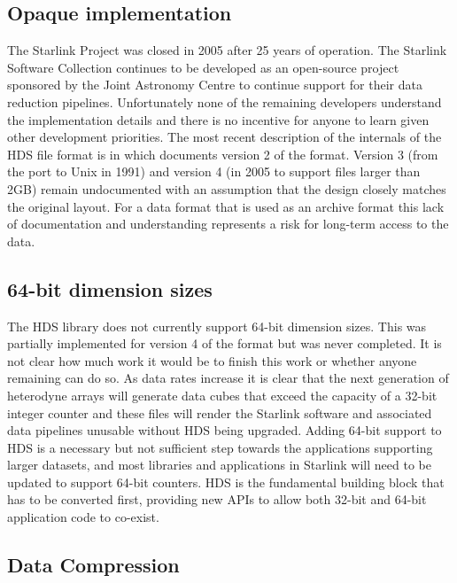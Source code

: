 \documentclass[final,authoryear,5p,times,twocolumn]{elsarticle}
\begin{document}
\subsection{Opaque implementation}

The Starlink Project was closed in 2005 after 25 years of
operation. The Starlink Software Collection continues to be developed
as an open-source project sponsored by the Joint Astronomy Centre to
continue support for their data reduction pipelines. Unfortunately
none of the remaining developers understand the implementation details and there is
no incentive for anyone to learn given other development priorities. The most recent description of the
internals of the HDS file format is in \citet{SSN27a} which documents
version 2 of the format. Version 3 (from the port to Unix in 1991) and
version 4 (in 2005 to support files larger than 2GB) remain
undocumented with an assumption that the design closely matches the
original layout. For a data format that is used as an archive format
\citep{2015Economou} this lack of documentation and understanding
represents a risk for long-term access to the data.

\subsection{64-bit dimension sizes}

The HDS library does not currently support 64-bit dimension
sizes. This was partially implemented for version 4 of the format but
was never completed. It is not clear how much work it would be to finish
this work or whether anyone remaining can do so. As data rates
increase it is clear that the next generation of heterodyne arrays
\citep[e.g.,][]{jenness_spie2014} will generate data cubes that exceed
the capacity of a 32-bit integer counter and these files will render
the Starlink software and associated data pipelines unusable without
HDS being upgraded. Adding 64-bit support to HDS is a necessary but
not sufficient step towards the applications supporting larger
datasets, and most libraries and applications in Starlink will
need to be updated to support 64-bit counters. HDS is the
fundamental building block that has to be converted first, providing
new APIs to allow both 32-bit and 64-bit application code to co-exist.

\subsection{Data Compression}
\end{document}
